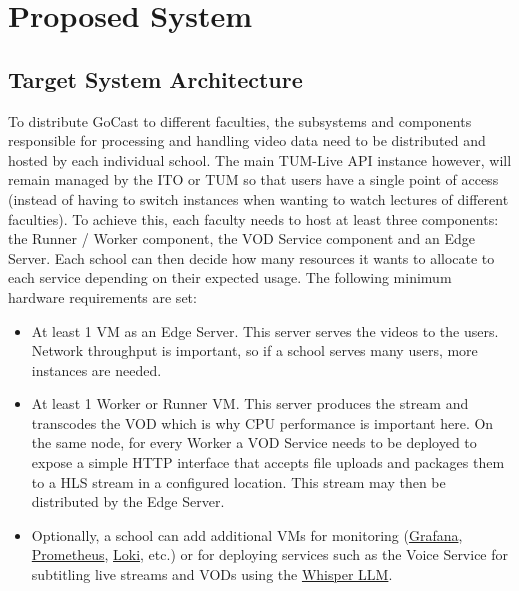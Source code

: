 \section{Proposed System}

\subsection{Target System Architecture}

To distribute GoCast to different faculties, the subsystems and components responsible for processing and handling video data need to be distributed and hosted by each individual school. 
The main TUM-Live \ac{API} instance however, will remain managed by the \ac{ITO} or \ac{TUM} so that users have a single point of access (instead of having to switch instances when wanting to watch lectures of different faculties).
To achieve this, each faculty needs to host at least three components: the Runner / Worker component, the VOD Service component and an Edge Server. 
Each school can then decide how many resources it wants to allocate to each service depending on their expected usage. The following minimum hardware requirements are set:

\begin{itemize}
    \item At least 1 \ac{VM} as an Edge Server. This server serves the videos to the users. Network throughput is important, so if a school serves many users, more instances are needed.
    \item At least 1 Worker or Runner \ac{VM}. This server produces the stream and transcodes the \ac{VOD} which is why CPU performance is important here. On the same node, for every Worker a VOD Service needs to be deployed to expose a simple HTTP interface that accepts file uploads and packages them to a \ac{HLS} stream in a configured location. This stream may then be distributed by the Edge Server.
    \item Optionally, a school can add additional \ac{VM}s for monitoring (\href{https://github.com/grafana/grafana}{Grafana}, \href{https://github.com/prometheus/prometheus}{Prometheus}, \href{https://github.com/grafana/loki}{Loki}, etc.) or for deploying services such as the Voice Service for subtitling live streams and \ac{VOD}s using the \href{https://github.com/openai/whisper}{Whisper LLM}.
\end{itemize}

